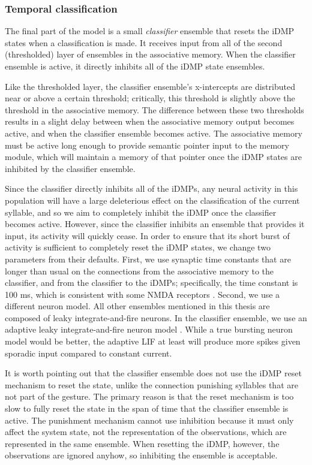 \subsubsection{Temporal classification}

The final part of the model is
a small \textit{classifier} ensemble
that resets the iDMP states
when a classification is made.
It receives input from all of the
second (thresholded) layer of ensembles
in the associative memory.
When the classifier ensemble is active,
it directly inhibits
all of the iDMP state ensembles.

Like the thresholded layer,
the classifier ensemble's
x-intercepts are distributed
near or above a certain threshold;
critically, this threshold
is slightly above the threshold
in the associative memory.
The difference between these two thresholds
results in a slight delay between
when the associative memory
output becomes active,
and when the classifier ensemble becomes active.
The associative memory
must be active long enough to provide
semantic pointer input to the
memory module,
which will maintain a memory of that pointer
once the iDMP states are inhibited
by the classifier ensemble.

Since the classifier directly inhibits
all of the iDMPs, any neural activity in this population
will have a large deleterious effect
on the classification of the current syllable,
and so we aim to completely inhibit
the iDMP once the classifier becomes active.
However, since the classifier inhibits
an ensemble that provides it input,
its activity will quickly cease.
In order to ensure that its short burst of activity
is sufficient to completely reset
the iDMP states,
we change two parameters from their defaults.
First, we use synaptic time constants
that are longer than usual on the connections
from the associative memory to the classifier,
and from the classifier to the iDMPs;
specifically, the time constant is 100 ms,
which is consistent with some NMDA receptors
\citep{sah1990}.
Second, we use a different neuron model.
All other ensembles mentioned in this thesis
are composed of leaky integrate-and-fire neurons.
In the classifier ensemble,
we use an adaptive leaky integrate-and-fire neuron model
\citep{koch1998}.
While a true bursting neuron model
would be better,
the adaptive LIF at least will produce
more spikes given
sporadic input compared to constant current.

It is worth pointing out that the
classifier ensemble does not use the
iDMP reset mechanism to reset the state,
unlike the connection punishing
syllables that are not part of the gesture.
The primary reason is that the reset mechanism
is too slow to fully reset the state
in the span of time that the classifier ensemble
is active.
The punishment mechanism cannot use inhibition
because it must only affect the system state,
not the representation of the observations,
which are represented in the same ensemble.
When resetting the iDMP, however,
the observations are ignored anyhow,
so inhibiting the ensemble
is acceptable.

